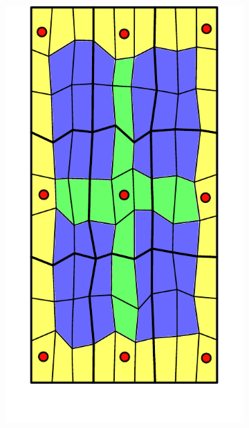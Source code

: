 \begin{figure} [htbp]
\begin{subfigure}[t]{0.22\textwidth}
  \centerline{\includegraphics[width=\linewidth]{figs/MsRSB/MPFA_9x9_b}}
  \caption{\label{fig:mpfa_demo_support}}
\end{subfigure}
\hfill
\begin{subfigure}[t]{0.22\textwidth}

\end{subfigure}
\end{figure}
